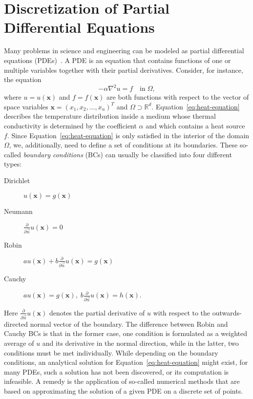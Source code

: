 \section{Discretization of Partial Differential Equations}\label{sec:discretization}
Many problems in science and engineering can be modeled as partial differential equations (PDEs)~\cite{folland2020introduction,evans2010partial}.
A PDE is an equation that contains functions of one or multiple variables together with their partial derivatives.
Consider, for instance, the equation
\begin{equation}
	-\alpha \nabla^2 u = f \quad \text{in} \; \Omega,
	\label{eq:heat-equation}
\end{equation}
where $u = u(\bm{x})$ and $f = f(\bm{x})$ are both functions with respect to the vector of space variables $\bm{x} = (x_1, x_2, \dots, x_n)^T$ and $\Omega \supset \mathbb{R}^d$.
Equation~\eqref{eq:heat-equation} describes the temperature distribution inside a medium whose thermal conductivity is determined by the coefficient $\alpha$ and which contains a heat source $f$.
Since Equation~\eqref{eq:heat-equation} is only satisfied in the interior of the domain $\Omega$, we, additionally, need to define a set of conditions at its boundaries.
These so-called \emph{boundary conditions} (BCs) can usually be classified into four different types:
\begin{description}
	\item[Dirichlet] $u(\bm{x}) = g(\bm{x})$
	\item[Neumann] $\frac{\partial}{\partial \vec{n}} u(\bm{x}) = 0$
	\item[Robin] $a u(\bm{x}) + b \frac{\partial}{\partial \vec{n}} u(\bm{x}) = g(\bm{x})$
	\item[Cauchy] $a u(\bm{x}) = g(\bm{x}), \; b \frac{\partial}{\partial \vec{n}} u(\bm{x}) = h(\bm{x})$.
\end{description}
Here $\frac{\partial}{\partial \vec{n}} u(\bm{x})$ denotes the partial derivative of $u$ with respect to the outwards-directed normal vector of the boundary.
The difference between Robin and Cauchy BCs is that in the former case, one condition is formulated as a weighted average of $u$ and its derivative in the normal direction, while in the latter, two conditions must be met individually.
While depending on the boundary conditions, an analytical solution for Equation~\eqref{eq:heat-equation} might exist, for many PDEs, such a solution has not been discovered, or its computation is infeasible.
A remedy is the application of so-called numerical methods that are based on approximating the solution of a given PDE on a discrete set of points. 
